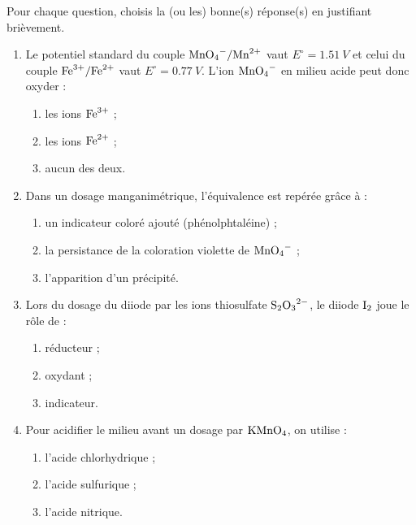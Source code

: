 \documentclass[11pt]{article}
\begin{document}
\begin{exercice}
Pour chaque question, choisis la (ou les) bonne(s) réponse(s) en justifiant brièvement.
\begin{enumerate}
\item Le potentiel standard du couple $\ce{MnO4-}/\ce{Mn^2+}$ vaut $E^\circ = \SI{1,51}{V}$ et celui du couple $\ce{Fe^3+}/\ce{Fe^2+}$ vaut $E^\circ = \SI{0,77}{V}$. L'ion $\ce{MnO4-}$ en milieu acide peut donc oxyder :
\begin{enumerate}
\item les ions $\ce{Fe^3+}$ ;
\item les ions $\ce{Fe^2+}$ ;
\item aucun des deux.
\end{enumerate}
\item Dans un dosage manganimétrique, l'équivalence est repérée grâce à :
\begin{enumerate}
\item un indicateur coloré ajouté (phénolphtaléine) ;
\item la persistance de la coloration violette de $\ce{MnO4-}$ ;
\item l'apparition d'un précipité.
\end{enumerate}
\item Lors du dosage du diiode par les ions thiosulfate $\ce{S2O3^2-}$, le diiode $\ce{I2}$ joue le rôle de :
\begin{enumerate}
\item réducteur ;
\item oxydant ;
\item indicateur.
\end{enumerate}
\item Pour acidifier le milieu avant un dosage par $\ce{KMnO4}$, on utilise :
\begin{enumerate}
\item l'acide chlorhydrique ;
\item l'acide sulfurique ;
\item l'acide nitrique.
\end{enumerate}
\end{enumerate}
\end{exercice}
\end{document}
